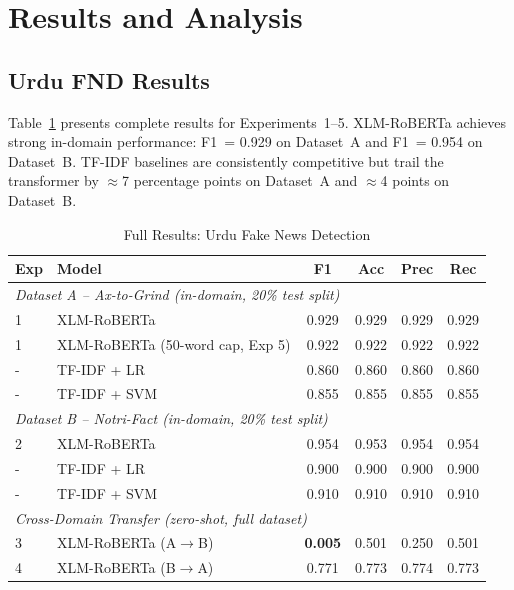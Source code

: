 \documentclass[conference]{IEEEtran}
\begin{document}
\clearpage
\section{Results and Analysis}
\label{sec:results}

\subsection{Urdu FND Results}

Table~\ref{tab:main_results_urdu} presents complete results for
Experiments~1--5. XLM-RoBERTa achieves strong in-domain performance:
F1~= 0.929 on Dataset~A and F1~= 0.954 on Dataset~B. TF-IDF
baselines are consistently competitive but trail the transformer by
$\approx$7 percentage points on Dataset~A and $\approx$4 points on
Dataset~B.

\begin{table}[!htb]
\centering
\caption{Full Results: Urdu Fake News Detection}
\label{tab:main_results_urdu}
\begin{tabular}{llcccc}
\toprule
\textbf{Exp} & \textbf{Model} & \textbf{F1} & \textbf{Acc} &
\textbf{Prec} & \textbf{Rec} \\
\midrule
\multicolumn{6}{l}{\textit{Dataset A -- Ax-to-Grind (in-domain, 20\% test split)}} \\
1 & XLM-RoBERTa              & 0.929 & 0.929 & 0.929 & 0.929 \\
1 & XLM-RoBERTa (50-word cap, Exp 5) & 0.922 & 0.922 & 0.922 & 0.922 \\
- & TF-IDF + LR              & 0.860 & 0.860 & 0.860 & 0.860 \\
- & TF-IDF + SVM             & 0.855 & 0.855 & 0.855 & 0.855 \\
\midrule
\multicolumn{6}{l}{\textit{Dataset B -- Notri-Fact (in-domain, 20\% test split)}} \\
2 & XLM-RoBERTa              & 0.954 & 0.953 & 0.954 & 0.954 \\
- & TF-IDF + LR              & 0.900 & 0.900 & 0.900 & 0.900 \\
- & TF-IDF + SVM             & 0.910 & 0.910 & 0.910 & 0.910 \\
\midrule
\multicolumn{6}{l}{\textit{Cross-Domain Transfer (zero-shot, full dataset)}} \\
3 & XLM-RoBERTa (A$\to$B)   & \textbf{0.005} & 0.501 & 0.250 & 0.501 \\
4 & XLM-RoBERTa (B$\to$A)   & 0.771 & 0.773 & 0.774 & 0.773 \\
\bottomrule
\end{tabular}
\end{table}
\end{document}
